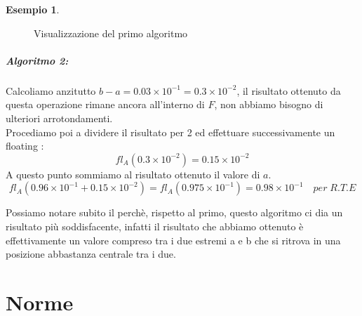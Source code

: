 \documentclass[12pt, a4paper]{book}
\theoremstyle{definition}
\newtheorem{exmp}{Esempio}[section]
\begin{document}
\begin{flushleft}
\begin{exmp}
\begin{figure}[h!]
\caption{Visualizzazione del primo algoritmo}
\label{Primo algoritmo risolutivo}
\end{figure}

\paragraph{Algoritmo 2:}
Calcoliamo anzitutto $b-a= 0.03 \times 10^{-1} = 0.3 \times 10^{-2}$, il risultato ottenuto da questa operazione rimane ancora all'interno di $F$, non abbiamo bisogno di ulteriori arrotondamenti. \\
Procediamo poi a dividere il risultato per 2 ed effettuare successivamente un floating :
\[ fl_{A}(0.3 \times 10^{-2}) = 0.15 \times 10 ^ {-2} \]
A questo punto sommiamo al risultato ottenuto il valore di $a$.
\[ fl_{A}(0.96 \times 10^{-1} + 0.15 \times 10 ^ {-2}) =  fl_{A}(0.975 \times 10^{-1}) = 0.98 \times 10^{-1} \quad per\; R.T.E\]

Possiamo notare subito il perchè, rispetto al primo, questo algoritmo ci dia un risultato più soddisfacente, infatti il risultato che abbiamo ottenuto è effettivamente un valore compreso tra i due estremi a e b che si ritrova in una posizione abbastanza centrale tra i due.
\end{exmp}
\end{flushleft}

\chapter{Norme}
\end{document}
